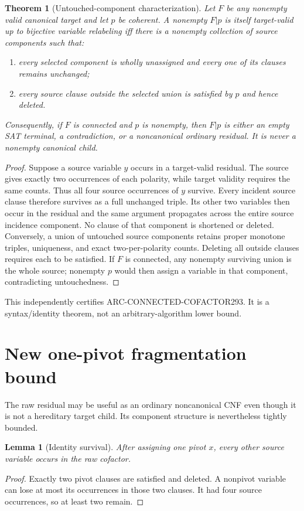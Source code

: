 \documentclass[11pt]{article}
\newtheorem{theorem}{Theorem}
\newtheorem{lemma}{Lemma}
\begin{document}
\begin{theorem}[Untouched-component characterization]
Let $F$ be any nonempty valid canonical target and let $p$ be coherent.  A nonempty $F|p$ is itself target-valid up to bijective variable relabeling iff there is a nonempty collection of source components such that:
\begin{enumerate}
\item every selected component is wholly unassigned and every one of its clauses remains unchanged;
\item every source clause outside the selected union is satisfied by $p$ and hence deleted.
\end{enumerate}
Consequently, if $F$ is connected and $p$ is nonempty, then $F|p$ is either an empty SAT terminal, a contradiction, or a noncanonical ordinary residual.  It is never a nonempty canonical child.
\end{theorem}
\begin{proof}
Suppose a source variable $y$ occurs in a target-valid residual.  The source gives exactly two occurrences of each polarity, while target validity requires the same counts.  Thus all four source occurrences of $y$ survive.  Every incident source clause therefore survives as a full unchanged triple.  Its other two variables then occur in the residual and the same argument propagates across the entire source incidence component.  No clause of that component is shortened or deleted.  Conversely, a union of untouched source components retains proper monotone triples, uniqueness, and exact two-per-polarity counts.  Deleting all outside clauses requires each to be satisfied.  If $F$ is connected, any nonempty surviving union is the whole source; nonempty $p$ would then assign a variable in that component, contradicting untouchedness.
\end{proof}

This independently certifies ARC-CONNECTED-COFACTOR293.  It is a syntax/identity theorem, not an arbitrary-algorithm lower bound.

\section{New one-pivot fragmentation bound}
The raw residual may be useful as an ordinary noncanonical CNF even though it is not a hereditary target child.  Its component structure is nevertheless tightly bounded.

\begin{lemma}[Identity survival]
After assigning one pivot $x$, every other source variable occurs in the raw cofactor.
\end{lemma}
\begin{proof}
Exactly two pivot clauses are satisfied and deleted.  A nonpivot variable can lose at most its occurrences in those two clauses.  It had four source occurrences, so at least two remain.
\end{proof}
\end{document}
